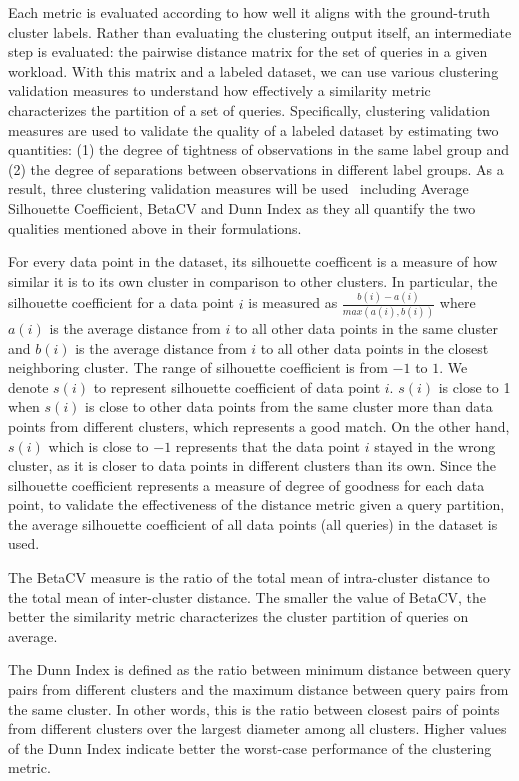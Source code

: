 Each metric is evaluated according to how well it aligns with the ground-truth cluster labels. 
Rather than evaluating the clustering output itself, an intermediate step is evaluated: the pairwise distance matrix for the set of queries in a given workload. 
With this matrix and a labeled dataset, we can use various clustering validation measures to understand how effectively a similarity metric characterizes the partition of a set of queries. 
Specifically, clustering validation measures are used to validate the quality of a labeled dataset by estimating two quantities: (1) the degree of tightness of observations in the same label group and (2) the degree of separations between observations in different label groups. 
As a result, three clustering validation measures will be used~\cite[Chapter~17]{zaki2014data} including Average Silhouette Coefficient, BetaCV and Dunn Index as they all quantify the two qualities mentioned above in their formulations.

For every data point in the dataset, its silhouette coefficent is a measure of how similar it is to its own cluster in comparison to other clusters. 
In particular, the silhouette coefficient for a data point $i$ is measured as $\frac{b(i)-a(i)}{max(a(i),b(i))}$ where $a(i)$ is the average distance from $i$ to all other data points in the same cluster and $b(i)$ is the average distance from $i$ to all other data points in the closest neighboring cluster. 
The range of silhouette coefficient is from $-1$ to $1$. 
We denote $s(i)$ to represent silhouette coefficient of data point $i$. 
$s(i)$ is close to 1 when $s(i)$ is close to other data points from the same cluster more than data points from different clusters, which represents a good match. 
On the other hand, $s(i)$ which is close to $-1$ represents that the data point $i$ stayed in the wrong cluster, as it is closer to data points in different clusters than its own. Since the silhouette coefficient represents a measure of degree of goodness for each data point, to validate the effectiveness of the distance metric given a query partition, the average silhouette coefficient of all data points (all queries) in the dataset is used. 

The BetaCV measure is the ratio of the total mean of intra-cluster distance to the total mean of inter-cluster distance. The smaller the value of BetaCV, the better the similarity metric characterizes the cluster partition of queries on average.

The Dunn Index is defined as the ratio between minimum distance between query pairs from different clusters and the maximum distance between query pairs from the same cluster.
In other words, this is the ratio between closest pairs of points from different clusters over the largest diameter among all clusters.
Higher values of the Dunn Index indicate better the worst-case performance of the clustering metric.

